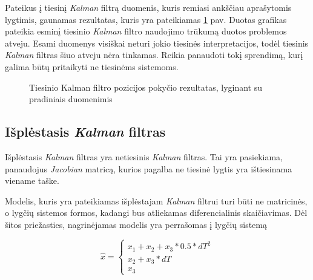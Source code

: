 Pateikus į tiesinį \textit{Kalman} filtrą duomenis, kuris remiasi ankščiau aprašytomis lygtimis, gaunamas rezultatas, kuris yra pateikiamas \ref{fig:linear_kalman_filter_sin} pav.
Duotas grafikas pateikia esminį tiesinio \textit{Kalman} filtro naudojimo trūkumą duotos problemos atveju.
Esami duomenys visiškai neturi jokio tiesinės interpretacijos, todėl tiesinis \textit{Kalman} filtras šiuo atveju nėra tinkamas.
Reikia panaudoti tokį sprendimą, kurį galima būtų pritaikyti ne tiesinėms sistemoms.

\begin{figure}
    \centering
    \caption{Tiesinio Kalman filtro pozicijos pokyčio rezultatas, lyginant su pradiniais duomenimis}
    \label{fig:linear_kalman_filter_sin}
\end{figure}

\subsection{Išplėstasis \textit{Kalman} filtras}

Išplėstasis \textit{Kalman} filtras yra netiesinis \textit{Kalman} filtras.
Tai yra pasiekiama, panaudojus \textit{Jacobian} matricą, kurios pagalba ne tiesinė lygtis yra ištiesinama viename taške.

Modelis, kuris yra pateikiamas išplėstajam \textit{Kalman} filtrui turi būti ne matricinės, o lygčių sistemos formos, kadangi bus atliekamas diferencialinis skaičiavimas.
Dėl šitos priežasties, nagrinėjamas modelis yra perrašomas į lygčių sistemą

\begin{equation}
    \hat{x} = \begin{cases}
        x_1 + x_2 + x_3 * 0.5 * dT^2 \\
        x_2 + x_3 * dT \\
        x_3
    \end{cases}
\end{equation}

